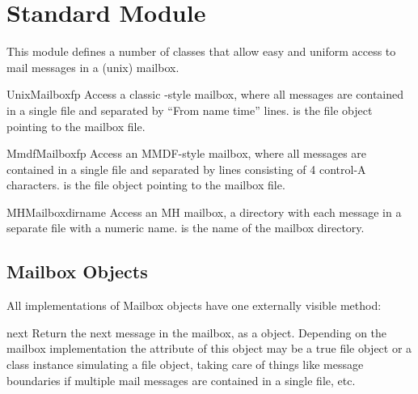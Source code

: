 \section{Standard Module }
\label{module-mailbox}


This module defines a number of classes that allow easy and uniform
access to mail messages in a (unix) mailbox.

\begin{funcdesc}{UnixMailbox}{fp}
Access a classic \UNIX{}-style mailbox, where all messages are contained
in a single file and separated by ``From name time'' lines. 
is the file object pointing to the mailbox file.
\end{funcdesc}

\begin{funcdesc}{MmdfMailbox}{fp}
Access an MMDF-style mailbox, where all messages are contained
in a single file and separated by lines consisting of 4 control-A
characters. 
is the file object pointing to the mailbox file.
\end{funcdesc}

\begin{funcdesc}{MHMailbox}{dirname}
Access an MH mailbox, a directory with each message in a separate
file with a numeric name. 
is the name of the mailbox directory.
\end{funcdesc}

\subsection{Mailbox Objects}

All implementations of Mailbox objects have one externally visible
method:

\begin{funcdesc}{next}{}
Return the next message in the mailbox, as a  object.
Depending on the mailbox implementation the  attribute of this
object may be a true file object or a class instance simulating a file object,
taking care of things like message boundaries if multiple mail messages are
contained in a single file, etc.
\end{funcdesc}

